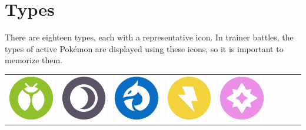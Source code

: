 \chapter{Types}
\label{chap:types}
There are eighteen types, each with a representative icon.
In trainer battles, the types of active Pokémon are displayed
 using these icons, so it is important to memorize them.

\begin{table}[h!]
  \begin{center}
  \begin{tabular}{c c c c c c c c c}
  \includegraphics[scale=.25]{images/bug.png} &
  \includegraphics[scale=.25]{images/dark.png} &
  \includegraphics[scale=.25]{images/dragon.png} &
  \includegraphics[scale=.25]{images/electric.png} &
  \includegraphics[scale=.25]{images/fairy.png} &

\end{tabular}
\end{center}
\end{table}
